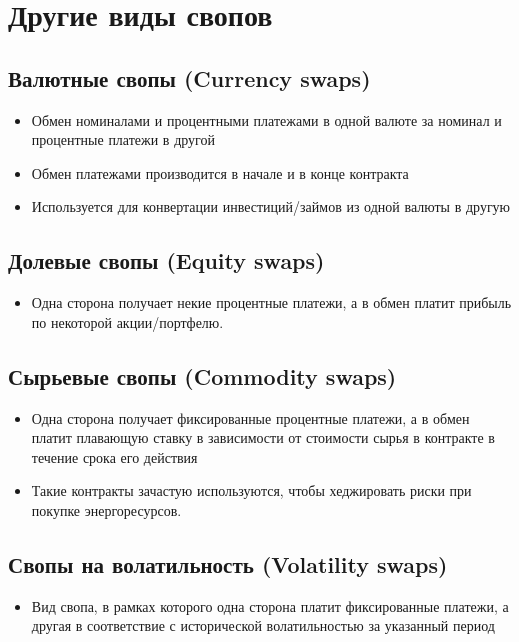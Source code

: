 \documentclass{article}
\begin{document}
\section{Другие виды свопов}
\subsection{Валютные свопы (Currency swaps)}

\begin{itemize}
    \item Обмен номиналами и процентными платежами в одной валюте за номинал и процентные платежи в другой
    \item Обмен платежами производится в начале и в конце контракта
    \item Используется для конвертации инвестиций/займов из одной валюты в другую
\end{itemize}

\subsection{Долевые свопы (Equity swaps)}
\begin{itemize}
    \item Одна сторона получает некие процентные платежи, а в обмен платит прибыль по некоторой акции/портфелю.
\end{itemize}

\subsection{Сырьевые свопы (Commodity swaps)}
\begin{itemize}
    \item Одна сторона получает фиксированные процентные платежи, а в обмен платит плавающую ставку в зависимости от стоимости сырья в контракте в течение срока его действия
    \item Такие контракты зачастую используются, чтобы хеджировать риски при покупке энергоресурсов.
\end{itemize}

\subsection{Свопы на волатильность (Volatility swaps)}
    \begin{itemize}
    \item Вид свопа, в рамках которого одна сторона платит фиксированные платежи, а другая в соответствие с исторической волатильностью за указанный период
    \end{itemize}

    
\end{document}
